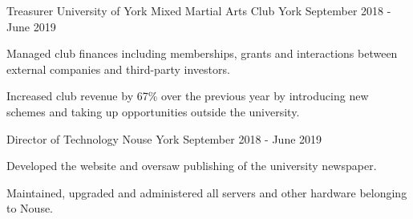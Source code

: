 
\begin{cventries}
  \cventry
    {Treasurer} %
    {University of York Mixed Martial Arts Club} %
    {York} %
    {September 2018 - June 2019} %
    {
      \begin{cvitems} %
         \item {Managed club finances including memberships, grants and interactions between external companies and third-party investors.}
         \vspace{0.5mm}
         \item {Increased club revenue by 67\% over the previous year by introducing new schemes and taking up opportunities outside the university.}
      \end{cvitems}
    }

  \cventry
    {Director of Technology} %
    {Nouse} %
    {York} %
    {September 2018 - June 2019} %
    {
      \begin{cvitems} %
         \item {Developed the website and oversaw publishing of the university newspaper.}
         \vspace{0.5mm}
         \item {Maintained, upgraded and administered all servers and other hardware belonging to Nouse.}
      \end{cvitems}
    }

\end{cventries}
